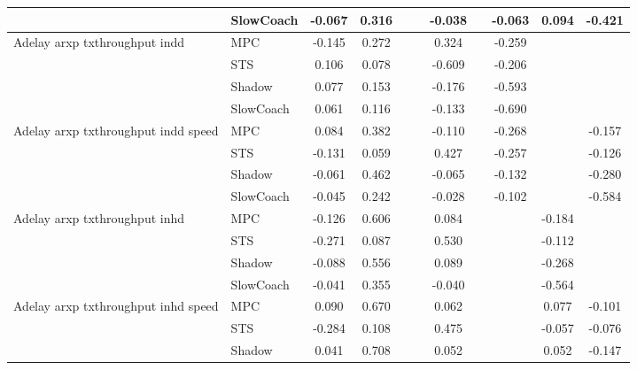 \begin{tabular}{|l|l|*{9}{c|}}
                              & SlowCoach &   -0.067 &     0.316 &        &     & -0.038 &     &  -0.063 &   0.094 &   -0.421 \\
\midrule
Adelay arxp txthroughput indd    & MPC &   -0.145 &     0.272 &        &     &  0.324 &     &  -0.259 &      &       \\
                              & STS &    0.106 &     0.078 &        &     & -0.609 &     &  -0.206 &      &       \\
                              & Shadow &    0.077 &     0.153 &        &     & -0.176 &     &  -0.593 &      &       \\
                              & SlowCoach &    0.061 &     0.116 &        &     & -0.133 &     &  -0.690 &      &       \\
\midrule
Adelay arxp txthroughput indd speed    & MPC &    0.084 &     0.382 &        &     & -0.110 &     &  -0.268 &      &   -0.157 \\
                              & STS &   -0.131 &     0.059 &        &     &  0.427 &     &  -0.257 &      &   -0.126 \\
                              & Shadow &   -0.061 &     0.462 &        &     & -0.065 &     &  -0.132 &      &   -0.280 \\
                              & SlowCoach &   -0.045 &     0.242 &        &     & -0.028 &     &  -0.102 &      &   -0.584 \\
\midrule
Adelay arxp txthroughput inhd    & MPC &   -0.126 &     0.606 &        &     &  0.084 &     &      &  -0.184 &       \\
                              & STS &   -0.271 &     0.087 &        &     &  0.530 &     &      &  -0.112 &       \\
                              & Shadow &   -0.088 &     0.556 &        &     &  0.089 &     &      &  -0.268 &       \\
                              & SlowCoach &   -0.041 &     0.355 &        &     & -0.040 &     &      &  -0.564 &       \\
\midrule
Adelay arxp txthroughput inhd speed    & MPC &    0.090 &     0.670 &        &     &  0.062 &     &      &   0.077 &   -0.101 \\
                              & STS &   -0.284 &     0.108 &        &     &  0.475 &     &      &  -0.057 &   -0.076 \\
                              & Shadow &    0.041 &     0.708 &        &     &  0.052 &     &      &   0.052 &   -0.147 \\

\end{tabular}
